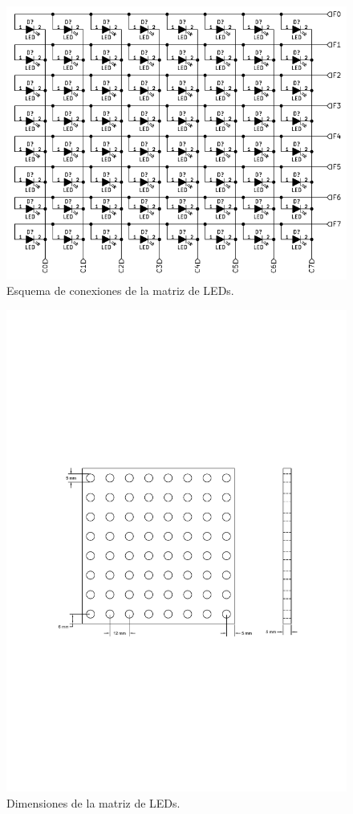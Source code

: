 \begin{figure}[!htp]
	\centering
	\includegraphics[width=0.7\linewidth]{imagenes/hw/modulo-led.pdf}
	\caption{Esquema de conexiones de la matriz de LEDs.}
	\label{fig:modulo-led}
\end{figure}
\begin{figure}[!htp]
	\centering
	\includegraphics[width=\linewidth]{imagenes/hw/modulo-led-dimensiones.pdf}
	\caption{Dimensiones de la matriz de LEDs.}
	\label{fig:modulo-led-dimensiones}
\end{figure}


